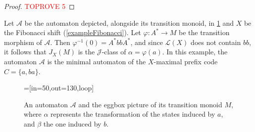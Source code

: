\documentclass[a4paper,UKenglish,numberwithinsect,cleveref]{lipics-v2021}
\newcommand{\drawgrid}[3]{
            \foreach \i in {2,...,#1}
                \draw (#3-\i-1.north west) to (#3-\i-#1.north east);
            \foreach \i in {2,...,#2}
                \draw (#3-1-\i.north west) to (#3-#2-\i.south west);
            }
\newcommand{\JJ}{\mathrel{\mathscr{J}}}
\newcommand{\A}{\mathcal A}
\newcommand{\cL}{\mathcal L}
\newcommand*{\from}{\colon}
\begin{document}
\begin{proof}\textcolor{red}{TOPROVE 5}\end{proof}

\begin{example}\label{ex:Jclass}
    Let $\A$ be the automaton depicted, alongside its transition monoid, in \cref{figureMonoidGolden} and $X$ be the Fibonacci shift (\cref{exampleFibonacci}). Let $\varphi\from A^*\to M$ be the transition morphism of $\A$. Then $\varphi^{-1}(0) = A^*bbA^*$, and since $\cL(X)$ does not contain $bb$, it follows that $J_X(M)$ is the $\JJ$-class of $\alpha=\varphi(a)$. In this example, the automaton $\A$ is the minimal automaton of the $X$-maximal prefix code $C=\{a,ba\}$.
    \begin{figure}
        \centering
        =[in=50,out=130,loop]
            \qquad
            \caption{An automaton $\A$ and the eggbox picture of its transition monoid $M$, where $\alpha$ represents the transformation of the states induced by $a$, and $\beta$ the one induced by $b$.}
            \label{figureMonoidGolden}
        \end{figure}
\end{example}
\end{document}
